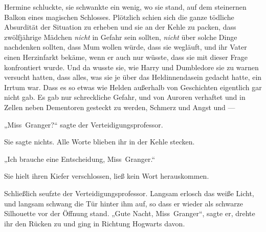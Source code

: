 Hermine schluckte, sie schwankte ein wenig, wo sie stand, auf dem steinernen Balkon eines magischen Schlosses. Plötzlich schien sich die ganze tödliche Absurdität der Situation zu erheben und sie an der Kehle zu packen, dass zwölfjährige Mädchen \emph{nicht} in Gefahr sein sollten, \emph{nicht} über solche Dinge nachdenken sollten, dass Mum wollen würde, dass sie wegläuft, und ihr Vater einen Herzinfarkt bekäme, wenn er auch nur wüsste, dass sie mit dieser Frage konfrontiert wurde.
%
Und da wusste sie, wie Harry und Dumbledore sie zu warnen versucht hatten, dass alles, was sie je über das Heldinnendasein gedacht hatte, ein Irrtum war. Dass es so etwas wie Helden außerhalb von Geschichten eigentlich gar nicht gab. Es gab nur schreckliche Gefahr, und von Auroren verhaftet und in Zellen neben Dementoren gesteckt zu werden, Schmerz und Angst und —

„Miss~Granger?“ sagte der Verteidigungsprofessor.

Sie sagte nichts. Alle Worte blieben ihr in der Kehle stecken.

„Ich brauche eine Entscheidung, Miss~Granger.“

Sie hielt ihren Kiefer verschlossen, ließ kein Wort herauskommen.

Schließlich seufzte der Verteidigungsprofessor. Langsam erlosch das weiße Licht, und langsam schwang die Tür hinter ihm auf, so dass er wieder als schwarze Silhouette vor der Öffnung stand.
„Gute Nacht, Miss~Granger“, sagte er, drehte ihr den Rücken zu und ging in Richtung Hogwarts davon.

